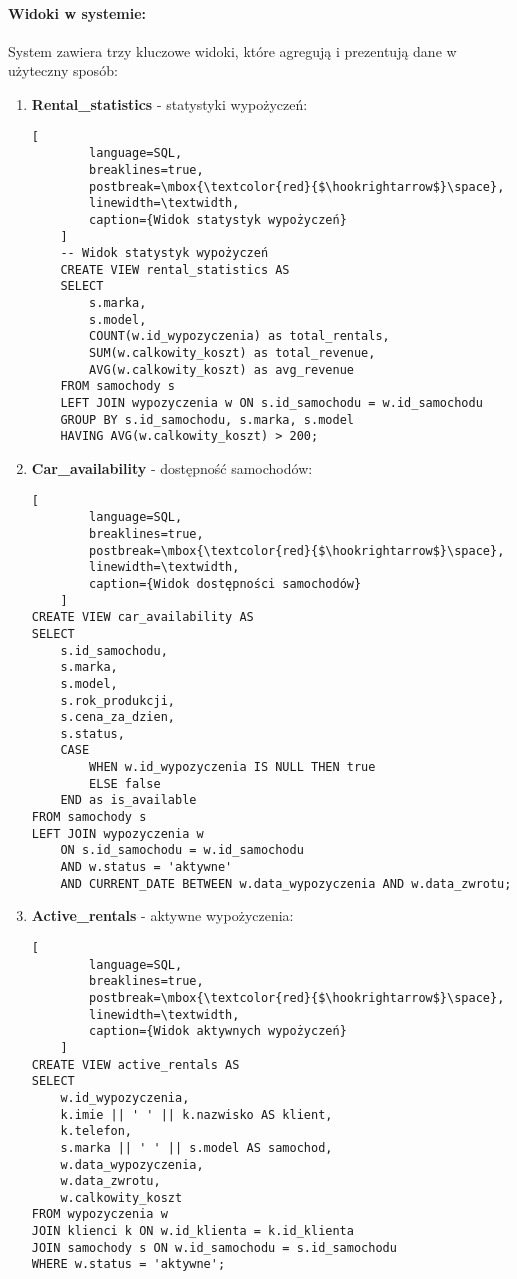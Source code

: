 \documentclass[12pt]{article}
\begin{document}
\paragraph{Widoki w systemie:}
System zawiera trzy kluczowe widoki, które agregują i prezentują dane w użyteczny sposób:

\begin{enumerate}
    \item \textbf{Rental\_statistics} - statystyki wypożyczeń:
    \begin{lstlisting}[
        language=SQL,
        breaklines=true,
        postbreak=\mbox{\textcolor{red}{$\hookrightarrow$}\space},
        linewidth=\textwidth,
        caption={Widok statystyk wypożyczeń}
    ]
    -- Widok statystyk wypożyczeń
    CREATE VIEW rental_statistics AS
    SELECT
        s.marka,
        s.model,
        COUNT(w.id_wypozyczenia) as total_rentals,
        SUM(w.calkowity_koszt) as total_revenue,
        AVG(w.calkowity_koszt) as avg_revenue
    FROM samochody s
    LEFT JOIN wypozyczenia w ON s.id_samochodu = w.id_samochodu
    GROUP BY s.id_samochodu, s.marka, s.model
    HAVING AVG(w.calkowity_koszt) > 200;

    \end{lstlisting}
    \newpage
    \item \textbf{Car\_availability} - dostępność samochodów:
    \begin{lstlisting}[
        language=SQL,
        breaklines=true,
        postbreak=\mbox{\textcolor{red}{$\hookrightarrow$}\space},
        linewidth=\textwidth,
        caption={Widok dostępności samochodów}
    ]
CREATE VIEW car_availability AS
SELECT
    s.id_samochodu,
    s.marka,
    s.model,
    s.rok_produkcji,
    s.cena_za_dzien,
    s.status,
    CASE
        WHEN w.id_wypozyczenia IS NULL THEN true
        ELSE false
    END as is_available
FROM samochody s
LEFT JOIN wypozyczenia w 
    ON s.id_samochodu = w.id_samochodu
    AND w.status = 'aktywne'
    AND CURRENT_DATE BETWEEN w.data_wypozyczenia AND w.data_zwrotu;
    \end{lstlisting}

    \item \textbf{Active\_rentals} - aktywne wypożyczenia:
    \begin{lstlisting}[
        language=SQL,
        breaklines=true,
        postbreak=\mbox{\textcolor{red}{$\hookrightarrow$}\space},
        linewidth=\textwidth,
        caption={Widok aktywnych wypożyczeń}
    ]
CREATE VIEW active_rentals AS
SELECT
    w.id_wypozyczenia,
    k.imie || ' ' || k.nazwisko AS klient,
    k.telefon,
    s.marka || ' ' || s.model AS samochod,
    w.data_wypozyczenia,
    w.data_zwrotu,
    w.calkowity_koszt
FROM wypozyczenia w
JOIN klienci k ON w.id_klienta = k.id_klienta
JOIN samochody s ON w.id_samochodu = s.id_samochodu
WHERE w.status = 'aktywne';
    \end{lstlisting}
\end{enumerate}
\end{document}
